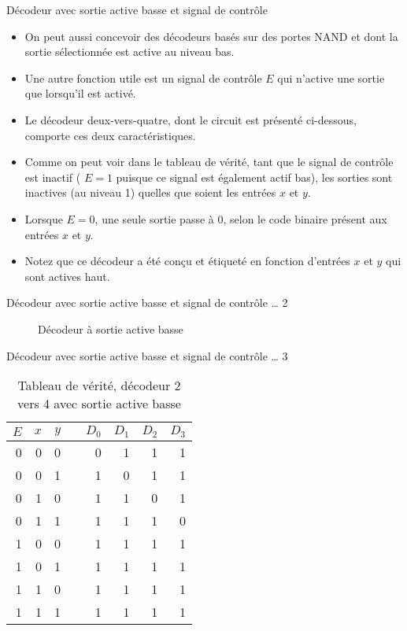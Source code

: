 \documentclass[presentation]{beamer}
\begin{document}
\begin{frame}[label={sec:orgd0b65b6}]{Décodeur avec sortie active basse et signal de contrôle}
\begin{itemize}
\item On peut aussi concevoir des décodeurs basés sur des portes NAND et dont la sortie sélectionnée est active au niveau bas.

\item Une autre fonction utile est un signal de contrôle \(E\) qui n'active une sortie que lorsqu'il est activé.

\item Le décodeur deux-vers-quatre, dont le circuit est présenté ci-dessous, comporte ces deux caractéristiques.

\item Comme on peut voir dans le tableau de vérité, tant que le signal de contrôle est inactif ( \(E = 1\) puisque ce signal est également actif bas), les sorties sont inactives (au niveau 1) quelles que soient les entrées \(x\) et \(y\).

\item Lorsque \(E = 0\), une seule sortie passe à 0, selon le code binaire présent aux entrées \(x\) et \(y\).

\item Notez que ce décodeur a été conçu et étiqueté en fonction d'entrées \(x\) et \(y\) qui sont actives haut.
\end{itemize}
\end{frame}

\begin{frame}[label={sec:orgef5f6ca}]{Décodeur avec sortie active basse et signal de contrôle \ldots{} 2}
\begin{figure}[htbp]
\centering

\caption{\label{fig:org2acff2f}Décodeur à sortie active basse}
\end{figure}
\end{frame}

\begin{frame}[label={sec:org17e40d6}]{Décodeur avec sortie active basse et signal de contrôle \ldots{} 3}
\begin{table}[htbp]
\caption{\label{tab:org06f59b6}Tableau de vérité, décodeur 2 vers 4 avec sortie active basse}
\centering
\begin{tabular}{rrrlrrrr}
\(E\) & \(x\) & \(y\) &  & \(D_0\) & \(D_1\) & \(D_2\) & \(D_3\)\\[0pt]
\hline
0 & 0 & 0 &  & 0 & 1 & 1 & 1\\[0pt]
0 & 0 & 1 &  & 1 & 0 & 1 & 1\\[0pt]
0 & 1 & 0 &  & 1 & 1 & 0 & 1\\[0pt]
0 & 1 & 1 &  & 1 & 1 & 1 & 0\\[0pt]
1 & 0 & 0 &  & 1 & 1 & 1 & 1\\[0pt]
1 & 0 & 1 &  & 1 & 1 & 1 & 1\\[0pt]
1 & 1 & 0 &  & 1 & 1 & 1 & 1\\[0pt]
1 & 1 & 1 &  & 1 & 1 & 1 & 1\\[0pt]
\end{tabular}
\end{table}
\end{frame}
\end{document}
